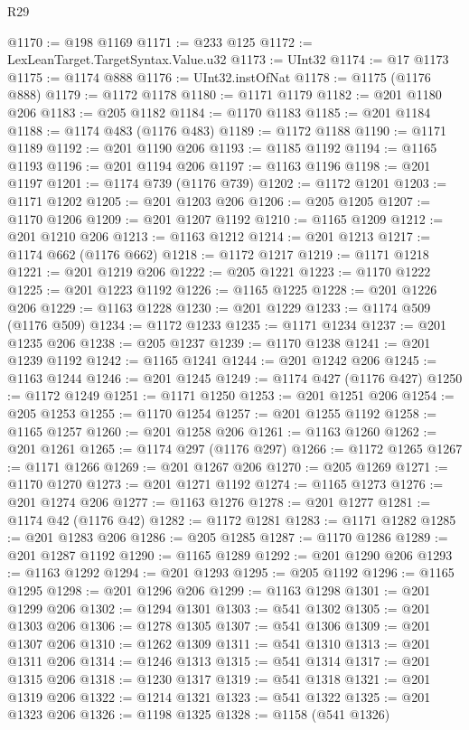 \begin{lexlean}{R29}
\begin{coremodule}
@1170 := @198 @1169
@1171 := @233 @125
@1172 := LexLeanTarget.TargetSyntax.Value.u32
@1173 := UInt32
@1174 := @17 @1173
@1175 := @1174 @888
@1176 := UInt32.instOfNat
@1178 := @1175 (@1176 @888)
@1179 := @1172 @1178
@1180 := @1171 @1179
@1182 := @201 @1180 @206
@1183 := @205 @1182
@1184 := @1170 @1183
@1185 := @201 @1184
@1188 := @1174 @483 (@1176 @483)
@1189 := @1172 @1188
@1190 := @1171 @1189
@1192 := @201 @1190 @206
@1193 := @1185 @1192
@1194 := @1165 @1193
@1196 := @201 @1194 @206
@1197 := @1163 @1196
@1198 := @201 @1197
@1201 := @1174 @739 (@1176 @739)
@1202 := @1172 @1201
@1203 := @1171 @1202
@1205 := @201 @1203 @206
@1206 := @205 @1205
@1207 := @1170 @1206
@1209 := @201 @1207 @1192
@1210 := @1165 @1209
@1212 := @201 @1210 @206
@1213 := @1163 @1212
@1214 := @201 @1213
@1217 := @1174 @662 (@1176 @662)
@1218 := @1172 @1217
@1219 := @1171 @1218
@1221 := @201 @1219 @206
@1222 := @205 @1221
@1223 := @1170 @1222
@1225 := @201 @1223 @1192
@1226 := @1165 @1225
@1228 := @201 @1226 @206
@1229 := @1163 @1228
@1230 := @201 @1229
@1233 := @1174 @509 (@1176 @509)
@1234 := @1172 @1233
@1235 := @1171 @1234
@1237 := @201 @1235 @206
@1238 := @205 @1237
@1239 := @1170 @1238
@1241 := @201 @1239 @1192
@1242 := @1165 @1241
@1244 := @201 @1242 @206
@1245 := @1163 @1244
@1246 := @201 @1245
@1249 := @1174 @427 (@1176 @427)
@1250 := @1172 @1249
@1251 := @1171 @1250
@1253 := @201 @1251 @206
@1254 := @205 @1253
@1255 := @1170 @1254
@1257 := @201 @1255 @1192
@1258 := @1165 @1257
@1260 := @201 @1258 @206
@1261 := @1163 @1260
@1262 := @201 @1261
@1265 := @1174 @297 (@1176 @297)
@1266 := @1172 @1265
@1267 := @1171 @1266
@1269 := @201 @1267 @206
@1270 := @205 @1269
@1271 := @1170 @1270
@1273 := @201 @1271 @1192
@1274 := @1165 @1273
@1276 := @201 @1274 @206
@1277 := @1163 @1276
@1278 := @201 @1277
@1281 := @1174 @42 (@1176 @42)
@1282 := @1172 @1281
@1283 := @1171 @1282
@1285 := @201 @1283 @206
@1286 := @205 @1285
@1287 := @1170 @1286
@1289 := @201 @1287 @1192
@1290 := @1165 @1289
@1292 := @201 @1290 @206
@1293 := @1163 @1292
@1294 := @201 @1293
@1295 := @205 @1192
@1296 := @1165 @1295
@1298 := @201 @1296 @206
@1299 := @1163 @1298
@1301 := @201 @1299 @206
@1302 := @1294 @1301
@1303 := @541 @1302
@1305 := @201 @1303 @206
@1306 := @1278 @1305
@1307 := @541 @1306
@1309 := @201 @1307 @206
@1310 := @1262 @1309
@1311 := @541 @1310
@1313 := @201 @1311 @206
@1314 := @1246 @1313
@1315 := @541 @1314
@1317 := @201 @1315 @206
@1318 := @1230 @1317
@1319 := @541 @1318
@1321 := @201 @1319 @206
@1322 := @1214 @1321
@1323 := @541 @1322
@1325 := @201 @1323 @206
@1326 := @1198 @1325
@1328 := @1158 (@541 @1326)

\end{coremodule}
\end{lexlean}
